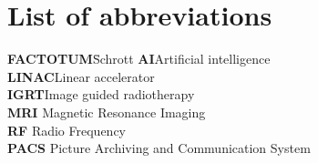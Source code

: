 \documentclass[12pt,a4paper]{report}
\begin{document}
\printbibliography



\newpage
\appendix

\chapter*{List of abbreviations}

\begin{tabbing}
	\textbf{FACTOTUM}\hspace{1cm}\=Schrott\kill
    \textbf{AI}\>Artificial intelligence  \\
	\textbf{LINAC}\>Linear accelerator \\
    \textbf{IGRT}\>Image guided radiotherapy  \\
	\textbf{MRI} \> Magnetic Resonance Imaging\\
    \textbf{RF} \> Radio Frequency\\
    \textbf{PACS} \> Picture Archiving and Communication System\\
\end{tabbing}

\newpage


\renewcommand{\baselinestretch}{1.3}
\small\normalsize

\listoffigures

\renewcommand{\baselinestretch}{1}
\small\normalsize

\newpage


\renewcommand{\baselinestretch}{1.3}
\small\normalsize

\listoftables

\renewcommand{\baselinestretch}{1}
\small\normalsize

\newpage

\end{document}
